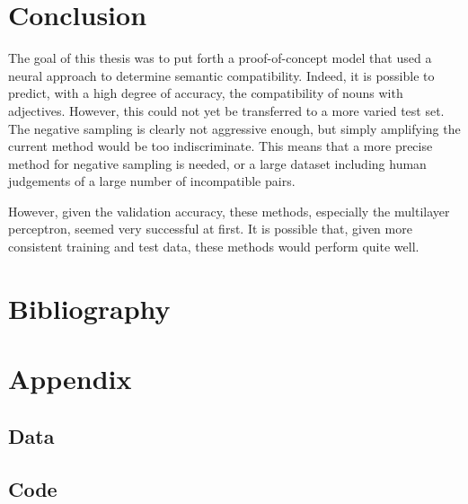 \documentclass[a4paper, 12pt]{scrartcl}
\begin{document}
\section{Conclusion}
The goal of this thesis was to put forth a proof-of-concept model that used a neural approach to determine semantic compatibility. Indeed, it is possible to predict, with a high degree of accuracy, the compatibility of nouns with adjectives. However, this could not yet be transferred to a more varied test set. The negative sampling is clearly not aggressive enough, but simply amplifying the current method would be too indiscriminate. This means that a more precise method for negative sampling is needed, or a large dataset including human judgements of a large number of incompatible pairs.

However, given the validation accuracy, these methods, especially the multilayer perceptron, seemed very successful at first. It is possible that, given more consistent training and test data, these methods would perform quite well.


\clearpage
\section{Bibliography}


\printbibliography                      %

\section{Appendix}

\subsection{Data}

\subsection{Code}
\end{document}
